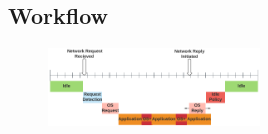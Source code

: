 \subsection{Workflow}
\label{sec:workflow}

\begin{figure}
\centering
\includegraphics[width=0.5\textwidth]{figures/timeline_chart}
\caption[]{}
\label{fig:timeline}
\end{figure}

